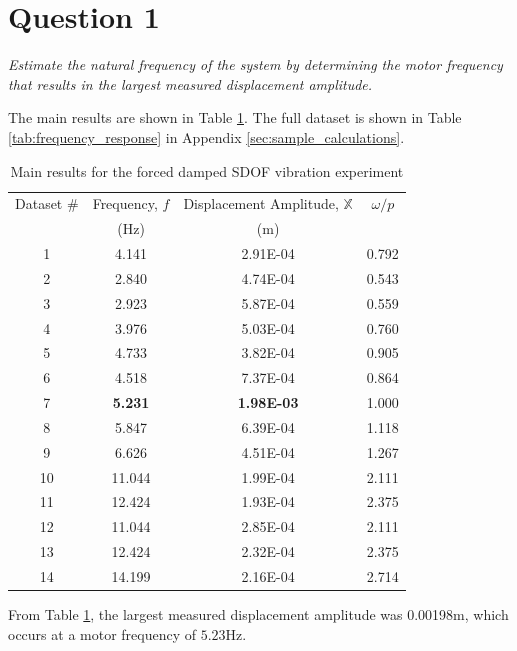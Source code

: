 \section{Question 1}
\textit{Estimate the natural frequency of the system by determining the motor frequency that results in the largest measured displacement amplitude.}

The main results are shown in Table \ref{tab:main_results}. The full dataset is shown in Table \ref{tab:frequency_response} in Appendix \ref{sec:sample_calculations}.
\begin{table}[H]
    \centering
    \caption{Main results for the forced damped SDOF vibration experiment}
    \label{tab:main_results}
    \begin{tabular}{cccc}
        \toprule
        Dataset \# & Frequency, $f$ & Displacement Amplitude, $\mathbb{X}$ & $\omega/p$ \\
        & (Hz) & (m) & \\
        \midrule
        1 & 4.141 & 2.91E-04 & 0.792 \\
        2 & 2.840 & 4.74E-04 & 0.543 \\
        3 & 2.923 & 5.87E-04 & 0.559 \\
        4 & 3.976 & 5.03E-04 & 0.760 \\
        5 & 4.733 & 3.82E-04 & 0.905 \\
        6 & 4.518 & 7.37E-04 & 0.864 \\
        7 & \textbf{5.231} & \textbf{1.98E-03} & 1.000 \\
        8 & 5.847 & 6.39E-04 & 1.118 \\
        9 & 6.626 & 4.51E-04 & 1.267 \\
        10 & 11.044 & 1.99E-04 & 2.111 \\
        11 & 12.424 & 1.93E-04 & 2.375 \\
        12 & 11.044 & 2.85E-04 & 2.111 \\
        13 & 12.424 & 2.32E-04 & 2.375 \\
        14 & 14.199 & 2.16E-04 & 2.714 \\
        \bottomrule
    \end{tabular}
\end{table}
From Table \ref{tab:main_results}, the largest measured displacement amplitude was 0.00198m, which occurs at a motor frequency of $\boxed{5.23 \text{Hz}}$.

